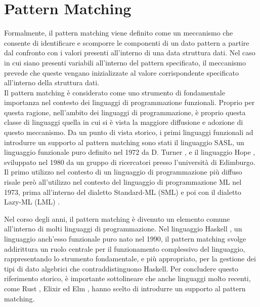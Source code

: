 \section{Pattern Matching}


Formalmente, il pattern matching viene definito come un meccanismo che consente
di identificare e scomporre le componenti di un dato pattern a partire dal
confronto con i valori presenti all’interno di una data struttura dati. Nel
caso in cui siano presenti variabili all’interno del pattern specificato, il
meccanismo prevede che queste vengano inizializzate al valore corrispondente
specificato all’interno della struttura dati.\\

Il pattern matching è considerato come uno strumento di fondamentale importanza
nel contesto dei linguaggi di programmazione funzionali. Proprio per questa
ragione, nell’ambito dei linguaggi di programmazione, è proprio questa classe
di linguaggi quella in cui si è vista la maggiore diffusione e adozione di
questo meccanismo. Da un punto di vista storico, i primi linguaggi funzionali
ad introdurre un supporto al pattern matching sono stati il linguaggio SASL, un
linguaggio funzionale puro definito nel 1972 da D. Turner
\cite{DBLP:journals/spe/Turner79}, e il linguaggio Hope
\cite{DBLP:conf/lfp/BurstallMS80}, sviluppato nel 1980 da un gruppo di
ricercatori presso l'università di Edimburgo. Il primo utilizzo nel contesto di
un linguaggio di programmazione più diffuso risale però all’utilizzo nel
contesto del linguaggio di programmazione ML nel 1973, prima all’interno del
dialetto Standard-ML (SML) \cite{milner1997definition} e poi con il dialetto
Lazy-ML (LML) \cite{DBLP:conf/lfp/Augustsson84}.

Nel corso degli anni, il pattern matching è divenuto un elemento comune
all'interno di molti linguaggi di programmazione. Nel linguaggio Haskell
\cite{DBLP:conf/hopl/HudakHJW07}, un linguaggio anch'esso funzionale puro nato
nel 1990, il pattern matching svolge addirittura un ruolo centrale per il
funzionamento complessivo del linguaggio, rappresentando lo strumento
fondamentale, e più appropriato, per la gestione dei tipi di dato algebrici che
contraddistinguono Haskell. Per concludere questo riferimento storico, è
importante sottolineare che anche linguaggi molto recenti, come Rust
\cite{rust2016}, Elixir \cite{laurent2014introducing} ed Elm \cite{elm2016},
hanno scelto di introdurre un supporto al pattern matching.

